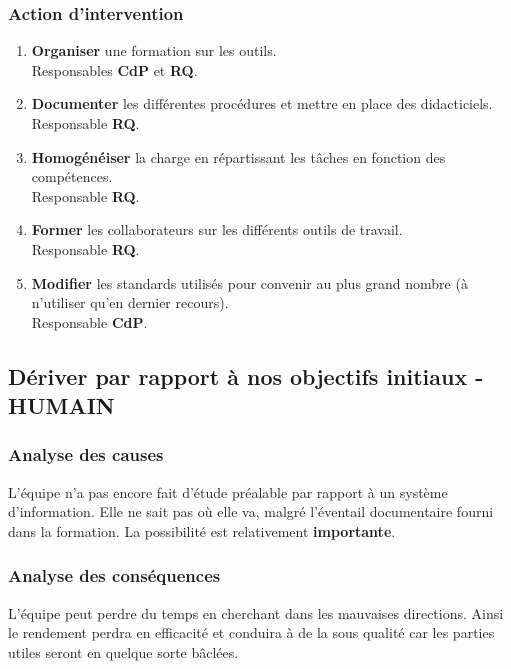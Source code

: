 \subsubsection{Action d'intervention}

\begin{enumerate}
\item {\bf Organiser} une formation sur les outils.\\
Responsables {\bf CdP} et {\bf RQ}.
\item {\bf Documenter} les différentes procédures et mettre en place des
didacticiels.\\
Responsable {\bf RQ}.
\item {\bf Homogénéiser} la charge en répartissant les tâches en fonction
des compétences. \\
Responsable {\bf RQ}.
\item {\bf Former} les collaborateurs sur les différents outils de travail. \\
Responsable {\bf RQ}.
\item {\bf Modifier} les standards utilisés pour convenir au plus grand nombre
(à n'utiliser qu'en dernier recours). \\Responsable {\bf CdP}.
\end{enumerate}

\subsection{Dériver par rapport à nos objectifs initiaux - HUMAIN}
\subsubsection{Analyse des causes}

L'équipe n'a pas encore fait d'étude préalable par rapport à un système
d'information. Elle ne sait pas où elle va, malgré l'éventail documentaire
fourni dans la formation. 
La possibilité est relativement {\bf importante}.

\subsubsection{Analyse des conséquences}

L'équipe peut perdre du temps en cherchant dans les mauvaises directions.
Ainsi le rendement perdra en efficacité et conduira à de la sous qualité car
les parties utiles seront en quelque sorte bâclées. 

